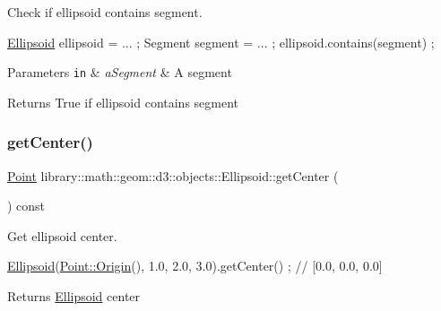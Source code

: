 Check if ellipsoid contains segment. 


\begin{DoxyCode}
\hyperlink{classlibrary_1_1math_1_1geom_1_1d3_1_1objects_1_1_ellipsoid_aae81fe0edc7f0e8d4590ea89ae73cb14}{Ellipsoid} ellipsoid = ... ;
Segment segment = ... ;
ellipsoid.contains(segment) ;
\end{DoxyCode}



\begin{DoxyParams}[1]{Parameters}
\mbox{\tt in}  & {\em a\+Segment} & A segment \\
\hline
\end{DoxyParams}
\begin{DoxyReturn}{Returns}
True if ellipsoid contains segment 
\end{DoxyReturn}
\mbox{\label{classlibrary_1_1math_1_1geom_1_1d3_1_1objects_1_1_ellipsoid_a646be2506950d250db0fb6610979bb46}} 
\subsubsection{\texorpdfstring{get\+Center()}{getCenter()}}
{\footnotesize\ttfamily \hyperlink{classlibrary_1_1math_1_1geom_1_1d3_1_1objects_1_1_point}{Point} library\+::math\+::geom\+::d3\+::objects\+::\+Ellipsoid\+::get\+Center (\begin{DoxyParamCaption}{ }\end{DoxyParamCaption}) const}



Get ellipsoid center. 


\begin{DoxyCode}
\hyperlink{classlibrary_1_1math_1_1geom_1_1d3_1_1objects_1_1_ellipsoid_aae81fe0edc7f0e8d4590ea89ae73cb14}{Ellipsoid}(\hyperlink{classlibrary_1_1math_1_1geom_1_1d3_1_1objects_1_1_point_ab2a38e285c562e50bf350272c083986f}{Point::Origin}(), 1.0, 2.0, 3.0).getCenter() ; \textcolor{comment}{// [0.0, 0.0, 0.0]}
\end{DoxyCode}


\begin{DoxyReturn}{Returns}
\hyperlink{classlibrary_1_1math_1_1geom_1_1d3_1_1objects_1_1_ellipsoid}{Ellipsoid} center 
\end{DoxyReturn}
\mbox{\label{classlibrary_1_1math_1_1geom_1_1d3_1_1objects_1_1_ellipsoid_a155ca01528d96ae76bfcbb155c832a20}} 
